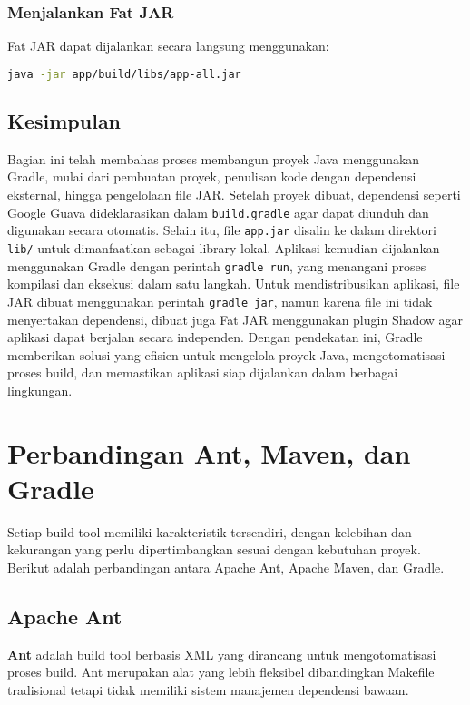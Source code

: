 \subsubsection{Menjalankan Fat JAR}
Fat JAR dapat dijalankan secara langsung menggunakan:
\begin{lstlisting}[language=bash]
	java -jar app/build/libs/app-all.jar
\end{lstlisting}

\subsection{Kesimpulan}

Bagian ini telah membahas proses membangun proyek Java menggunakan Gradle, mulai dari pembuatan proyek, penulisan kode dengan dependensi eksternal, hingga pengelolaan file JAR. Setelah proyek dibuat, dependensi seperti Google Guava dideklarasikan dalam \texttt{build.gradle} agar dapat diunduh dan digunakan secara otomatis. Selain itu, file \texttt{app.jar} disalin ke dalam direktori \texttt{lib/} untuk dimanfaatkan sebagai library lokal. Aplikasi kemudian dijalankan menggunakan Gradle dengan perintah \texttt{gradle run}, yang menangani proses kompilasi dan eksekusi dalam satu langkah. Untuk mendistribusikan aplikasi, file JAR dibuat menggunakan perintah \texttt{gradle jar}, namun karena file ini tidak menyertakan dependensi, dibuat juga Fat JAR menggunakan plugin Shadow agar aplikasi dapat berjalan secara independen. Dengan pendekatan ini, Gradle memberikan solusi yang efisien untuk mengelola proyek Java, mengotomatisasi proses build, dan memastikan aplikasi siap dijalankan dalam berbagai lingkungan.




\section{Perbandingan Ant, Maven, dan Gradle}
Setiap build tool memiliki karakteristik tersendiri, dengan kelebihan dan kekurangan yang perlu dipertimbangkan sesuai dengan kebutuhan proyek. Berikut adalah perbandingan antara Apache Ant, Apache Maven, dan Gradle.

\subsection{Apache Ant}
\textbf{Ant} adalah build tool berbasis XML yang dirancang untuk mengotomatisasi proses build. Ant merupakan alat yang lebih fleksibel dibandingkan Makefile tradisional tetapi tidak memiliki sistem manajemen dependensi bawaan.

